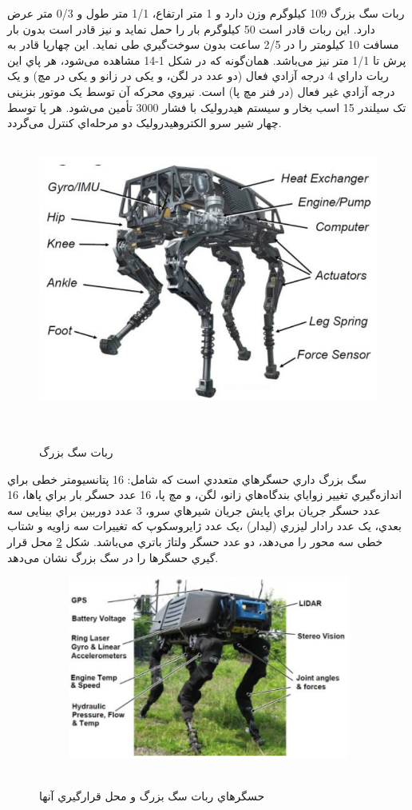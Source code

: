 \begin{itemize}
ربات سگ بزرگ 109 کیلوگرم وزن دارد و 1 متر ارتفاع، 1/1 متر طول و 0/3 متر عرض دارد. این ربات قادر است 50 کیلوگرم بار را حمل نماید و نیز قادر است بدون بار مسافت 10 کیلومتر را در 2/5 ساعت بدون سوخت‌گیري طی نماید. این چهارپا قادر به پرش تا 1/1 متر نیز می‌باشد.
همان‌گونه که در شكل 1-14 مشاهده می‌شود، هر پاي این ربات داراي 4 درجه آزادي فعال (دو عدد در لگن، و یكی در زانو و یكی در مچ) و یک درجه آزادي غیر فعال (در فنر مچ پا) است. نیروي محرکه آن توسط یک موتور بنزینی تک سیلندر 15 اسب بخار و سیستم هیدرولیک با فشار
 3000 
 تأمین می‌شود. هر پا توسط چهار شیر سرو الكتروهیدرولیک دو مرحله‌اي کنترل می‌گردد\cite{Big-Dog}.
    \begin{figure}[!h]
	\vspace{0.2cm}
	\centering
	\includegraphics[height=9cm,width=13cm]{./Images/CH1/big_dog.png}
	‌\caption[ربات سگ بزرگ]{ربات سگ بزرگ\cite{Big-Dog}}
	\label{ربات سگ بزرگ}
	\end{figure}

\newpage
سگ بزرگ داري حسگرهاي متعددي است که شامل: 16 پتانسیومتر خطی براي اندازه‌گیري تغییر زوایاي بندگاه‌هاي زانو، لگن، و مچ پا، 16 عدد حسگر بار 
\unskip{}
براي پاها، 16 عدد حسگر جریان براي پایش جریان شیرهاي سرو، 3 عدد دوربین براي بینایی سه بعدي، یک عدد رادار لیزري (لیدار)
\unskip{}
،یک عدد ژایروسکوپ 
\unskip{}
که تغییرات سه زاویه و شتاب خطی سه محور را می‌دهد، دو عدد حسگر ولتاژ باتري می‌باشد. شكل
\ref{حسگر ربات سگ بزرگ}
محل قرار گیري حسگرها را در سگ بزرگ نشان می‌دهد.
    \begin{figure}[!h]
	\vspace{0.2cm}
	\centering
	\includegraphics[height=6cm,width=12cm]{./Images/CH1/big_dog_sensors.png}
	‌\caption{حسگرهاي ربات سگ بزرگ و محل قرارگیري آنها}
	\label{حسگر ربات سگ بزرگ}
	\end{figure}


\end{itemize}
